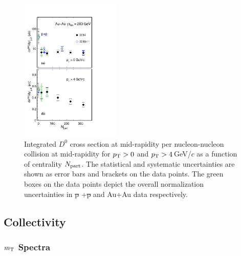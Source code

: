 \documentclass[%
 reprint,	
 amsmath,amssymb,
 aps,
 prc,
]{revtex4-1}
\providecommand{\DIFaddtex}[1]{{\protect\color{blue}\uwave{#1}}} %
\providecommand{\DIFdeltex}[1]{{\protect\color{red}\sout{#1}}}                      %
\providecommand{\DIFaddbegin}{} %
\providecommand{\DIFaddend}{} %
\providecommand{\DIFdelbegin}{} %
\providecommand{\DIFdelend}{} %
\providecommand{\DIFaddFL}[1]{\DIFadd{#1}} %
\providecommand{\DIFdelFL}[1]{\DIFdel{#1}} %
\providecommand{\DIFaddbeginFL}{} %
\providecommand{\DIFaddendFL}{} %
\providecommand{\DIFdelbeginFL}{} %
\providecommand{\DIFdelendFL}{} %
\providecommand{\DIFadd}[1]{\texorpdfstring{\DIFaddtex{#1}}{#1}} %
\providecommand{\DIFdel}[1]{\texorpdfstring{\DIFdeltex{#1}}{}} %
\begin{document}
\begin{figure}
\centering
\includegraphics[width=0.43\textwidth]{fig/Xsection_D0.pdf}
  \caption{Integrated $D^{0}$ cross section at mid-rapidity per nucleon-nucleon collision at mid-rapidity for \DIFdelbeginFL \DIFdelFL{$p_{\rm T}>0$ }\DIFdelendFL \DIFaddbeginFL \DIFaddFL{$p_{T}>0$ (a) }\DIFaddendFL and \DIFdelbeginFL \DIFdelFL{$p_{\rm T}>4$}\DIFdelendFL \DIFaddbeginFL \DIFaddFL{$p_{T}>4$}\DIFaddendFL \,GeV/$c$ \DIFaddbeginFL \DIFaddFL{(b) }\DIFaddendFL as a function of centrality $N_{\rm part}$. The statistical and systematic uncertainties are shown as error bars and brackets on the data points. The green boxes on the data points depict the overall normalization uncertainties in \DIFdelbeginFL \DIFdelFL{p }\DIFdelendFL \DIFaddbeginFL \DIFaddFL{$p$}\DIFaddendFL +\DIFdelbeginFL \DIFdelFL{p }\DIFdelendFL \DIFaddbeginFL \DIFaddFL{$p$ }\DIFaddendFL and Au+Au data respectively.}
\label{fig:Xsection_D0} 
\end{figure}

\subsection{\DIFdelbegin %
\DIFdelend Collectivity}
\DIFaddbegin \label{result:collectivity}
\DIFaddend 

\subsubsection{\DIFdelbegin %
\DIFdelend $m_{\rm T}$ Spectra}
\DIFaddbegin \label{result:collectivity:mT}
\DIFaddend 
\end{document}
